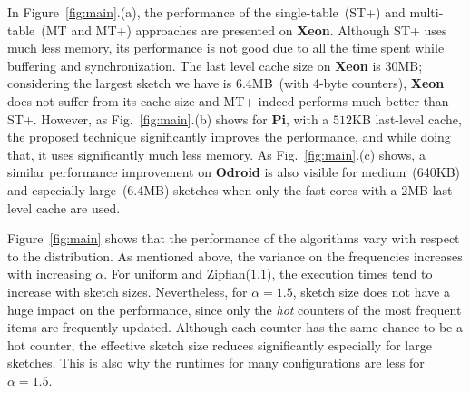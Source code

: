 \documentclass[runningheads]{llncs}
\begin{document}
In Figure~\ref{fig:main}.(a), the performance of the single-table~(ST+) and multi-table~(MT and MT+) approaches are presented on {\bf Xeon}. Although ST+ uses much less memory, its performance is not good due to all the time spent while buffering and synchronization. The last level cache size on  {\bf Xeon} is 30MB; considering the largest sketch we have is 6.4MB~(with 4-byte counters), {\bf Xeon} does not suffer from its cache size and MT+ indeed performs much better than ST+. However, as Fig.~\ref{fig:main}.(b) shows for {\bf Pi}, with a $512$KB last-level cache, the proposed technique significantly improves the performance, and while doing that, it uses significantly much less memory. As Fig.~\ref{fig:main}.(c) shows, a similar performance improvement on {\bf Odroid} is also visible for medium~(640KB) and especially large~(6.4MB) sketches when only the fast cores with a 2MB last-level cache are used. 

Figure~\ref{fig:main} shows that the performance of the algorithms vary with respect to the distribution. As mentioned above, the variance on the frequencies increases with increasing $\alpha$. For uniform and Zipfian($1.1$), the execution times tend to increase with sketch sizes. Nevertheless, for $\alpha = 1.5$, sketch size does not have a huge impact on the performance, since only the {\em hot} counters of the most frequent items are frequently updated. Although each counter has the same chance to be a hot counter, the effective sketch size reduces significantly especially for large sketches. This is also why the runtimes for many configurations are less for $\alpha = 1.5$. 
\end{document}
